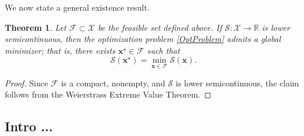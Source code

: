\documentclass[11pt,letterpaper]{article}
\theoremstyle{definition}
\theoremstyle{plain}
\newtheorem{theorem}{Theorem}[section]
\begin{document}







We now state a general existence result.


\begin{theorem}
\label{thm:existence_general}
Let $\mathcal{F} \subset \mathcal{X}$ be the feasible set defined above. If 
$\mathcal{S} : \mathcal{X} \to \mathbb{R}$ is lower semicontinuous, then the optimization problem \eqref{OptProblem} admits a global minimizer; that is, there exists $\mathbf{x}^\star \in \mathcal{F}$ such that
\[
\mathcal{S}(\mathbf{x}^\star) = \min_{\mathbf{x}\in\mathcal{F}} \mathcal{S}(\mathbf{x}).
\]
\end{theorem}

\begin{proof}
Since $\mathcal{F}$ is a compact, nonempty, and $\mathcal{S}$ is lower semicontinuous, the claim follows from the Weierstrass Extreme Value Theorem.
\end{proof}

\subsection{Intro ...}
\end{document}
